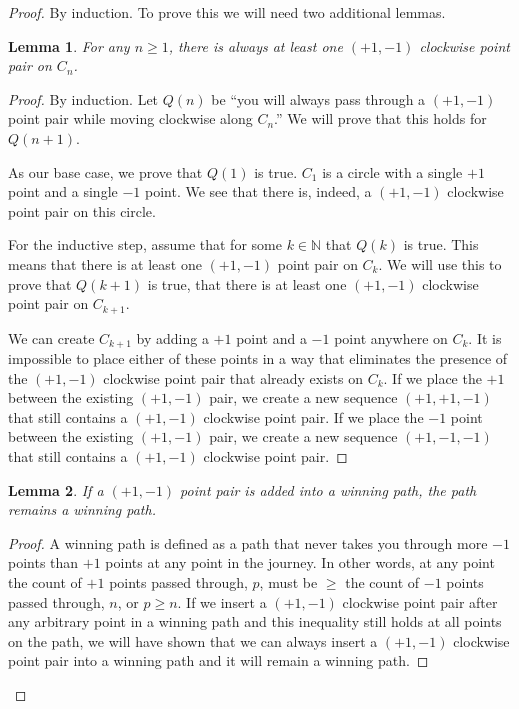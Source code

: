 \documentclass[10pt,letter]{article}
\newtheorem{lem}{Lemma}
\begin{document}
\begin{proof}
By induction. To prove this we will need two additional lemmas.
\begin{lem} \label{lemma:circle1}
For any $n \ge 1$, there is always at least one $(+1, -1)$ clockwise point pair on $C_n$.
\end{lem}
\begin{proof}
By induction. Let $Q(n)$ be ``you will always pass through a $(+1, -1)$ point pair while moving clockwise along $C_n$.'' We will prove that this holds for $Q(n+1)$.

As our base case, we prove that $Q(1)$ is true. $C_1$ is a circle with a single $+1$ point and a single $-1$ point. We see that there is, indeed, a $(+1, -1)$ clockwise point pair on this circle.

For the inductive step, assume that for some $k \in \mathbb{N}$ that $Q(k)$ is true. This means that there is at least one $(+1, -1)$ point pair on $C_k$. We will use this to prove that $Q(k+1)$ is true, that there is at least one $(+1, -1)$ clockwise point pair on $C_{k+1}$. 

We can create $C_{k+1}$ by adding a $+1$ point and a $-1$ point anywhere on $C_k$. It is impossible to place either of these points in a way that eliminates the presence of the $(+1, -1)$ clockwise point pair that already exists on $C_k$. If we place the $+1$ between the existing $(+1, -1)$ pair, we create a new sequence $(+1, +1, -1)$ that still contains a $(+1, -1)$ clockwise point pair. If we place the $-1$ point between the existing $(+1, -1)$ pair, we create a new sequence $(+1, -1, -1)$ that still contains a $(+1, -1)$ clockwise point pair.
\end{proof}

\begin{lem} \label{lemma:circle2}
If a $(+1, -1)$ point pair is added into a winning path, the path remains a winning path.
\end{lem}

\begin{proof}
A winning path is defined as a path that never takes you through more $-1$ points than $+1$ points at any point in the journey. In other words, at any point the count of $+1$ points passed through, $p$, must be $\ge$ the count of $-1$ points passed through, $n$, or $p \ge n$. If we insert a $(+1, -1)$ clockwise point pair after any arbitrary point in a winning path and this inequality still holds at all points on the path, we will have shown that we can always insert a $(+1, -1)$ clockwise point pair into a winning path and it will remain a winning path. 


\end{proof}
\end{proof}
\end{document}
